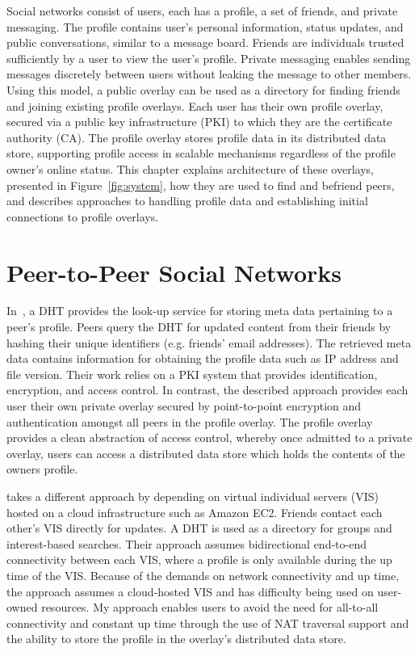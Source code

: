 Social networks consist of users, each has a profile, a set of friends, and
private messaging.  The profile contains user's personal information, status
updates, and public conversations, similar to a message board.  Friends are
individuals trusted sufficiently by a user to view the user's profile.  Private
messaging enables sending messages discretely between users without leaking the
message to other members.  Using this model, a public overlay can be used as a
directory for finding friends and joining existing profile overlays.  Each user
has their own profile overlay, secured via a public key infrastructure (PKI) to
which they are the certificate authority (CA).  The profile overlay stores
profile data in its distributed data store, supporting profile access in
scalable mechanisms regardless of the profile owner's online status.  This
chapter explains architecture of these overlays, presented in
Figure~\ref{fig:system}, how they are used to find and befriend peers, and
describes approaches to handling profile data and establishing initial
connections to profile overlays.

\section{Peer-to-Peer Social Networks}
In~\cite{peerson}, a DHT provides the look-up service for storing meta data
pertaining to a peer's profile. Peers query the DHT for updated content from 
their friends by hashing their unique identifiers (e.g. friends' email
addresses).  The retrieved meta data contains information for obtaining the
profile data such as IP address and file version. Their work relies
on a PKI system that provides identification, encryption, and access control.
In contrast, the described approach provides each user their own private
overlay secured by point-to-point encryption and authentication amongst all
peers in the profile overlay.  The profile overlay provides a clean abstraction
of access control, whereby once admitted to a private overlay, users can access
a distributed data store which holds the contents of the owners profile.

\cite{vis-a-vis} takes a different approach by depending on virtual individual
servers (VIS) hosted on a cloud infrastructure such as Amazon EC2. Friends
contact each other's VIS directly for updates.  A DHT is used as a directory for
groups and interest-based searches. Their approach assumes bidirectional
end-to-end connectivity between each VIS, where a profile is only available
during the up time of the VIS.  Because of the demands on network connectivity
and up time, the approach assumes a cloud-hosted VIS and has difficulty being used on user-owned resources.
My approach enables users to avoid the need for all-to-all connectivity and
constant up time through the use of NAT traversal support and the
ability to store the profile in the overlay's distributed data store.

